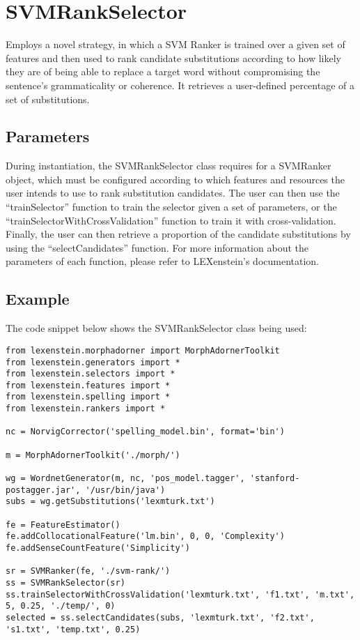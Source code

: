 \section{SVMRankSelector}

Employs a novel strategy, in which a SVM Ranker is trained over a given set of features and then used to rank candidate substitutions according to how likely they are of being able to replace a target word without compromising the sentence's grammaticality or coherence. It retrieves a user-defined percentage of a set of substitutions.

\subsection{Parameters}

During instantiation, the SVMRankSelector class requires for a SVMRanker object, which must be configured according to which features and resources the user intends to use to rank substitution candidates. The user can then use the ``trainSelector'' function to train the selector given a set of parameters, or the ``trainSelectorWithCrossValidation'' function to train it with cross-validation. Finally, the user can then retrieve a proportion of the candidate substitutions by using the ``selectCandidates'' function. For more information about the parameters of each function, please refer to LEXenstein's documentation.

\subsection{Example}

The code snippet below shows the SVMRankSelector class being used:

\begin{lstlisting}
from lexenstein.morphadorner import MorphAdornerToolkit
from lexenstein.generators import *
from lexenstein.selectors import *
from lexenstein.features import *
from lexenstein.spelling import *
from lexenstein.rankers import *

nc = NorvigCorrector('spelling_model.bin', format='bin')

m = MorphAdornerToolkit('./morph/')

wg = WordnetGenerator(m, nc, 'pos_model.tagger', 'stanford-postagger.jar', '/usr/bin/java')
subs = wg.getSubstitutions('lexmturk.txt')

fe = FeatureEstimator()
fe.addCollocationalFeature('lm.bin', 0, 0, 'Complexity')
fe.addSenseCountFeature('Simplicity')

sr = SVMRanker(fe, './svm-rank/')
ss = SVMRankSelector(sr)
ss.trainSelectorWithCrossValidation('lexmturk.txt', 'f1.txt', 'm.txt', 5, 0.25, './temp/', 0)
selected = ss.selectCandidates(subs, 'lexmturk.txt', 'f2.txt', 's1.txt', 'temp.txt', 0.25)
\end{lstlisting}










